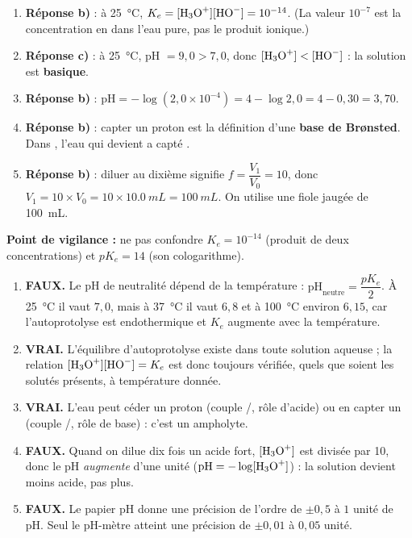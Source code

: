 \documentclass[11pt]{article}
\newcommand{\cle}[1]{{\popxbold\color{popdark}#1}}
\begin{document}
\begin{corrige}
\begin{enumerate}
\item \textbf{Réponse b)} : à \SI{25}{\celsius}, $K_e = [\ce{H3O+}][\ce{HO-}] = 10^{-14}$. (La valeur $10^{-7}$ est la concentration en  dans l'eau pure, pas le produit ionique.)
\item \textbf{Réponse c)} : à \SI{25}{\celsius}, pH $= 9{,}0 > 7{,}0$, donc $[\ce{H3O+}] < [\ce{HO-}]$ : la solution est \textbf{basique}.
\item \textbf{Réponse b)} : $\mathrm{pH} = -\log(2{,}0\times10^{-4}) = 4 - \log 2{,}0 = 4 - 0{,}30 = 3{,}70$.
\item \textbf{Réponse b)} : capter un proton est la définition d'une \textbf{base de Brønsted}. Dans , l'eau qui devient  a capté .
\item \textbf{Réponse b)} : diluer au dixième signifie $f = \dfrac{V_1}{V_0} = 10$, donc $V_1 = 10 \times V_0 = 10 \times \SI{10,0}{mL} = \SI{100}{mL}$. On utilise une fiole jaugée de \SI{100}{mL}.
\end{enumerate}
\textbf{Point de vigilance :} ne pas confondre $K_e = 10^{-14}$ (produit de deux concentrations) et $pK_e = 14$ (son cologarithme).
\end{corrige}

\begin{corrige}
\begin{enumerate}
\item \textbf{FAUX.} Le pH de neutralité dépend de la température : $\mathrm{pH}_{\text{neutre}} = \dfrac{pK_e}{2}$. À \SI{25}{\celsius} il vaut $7{,}0$, mais à \SI{37}{\celsius} il vaut $6{,}8$ et à \SI{100}{\celsius} environ $6{,}15$, car l'autoprotolyse est endothermique et $K_e$ augmente avec la température.
\item \textbf{VRAI.} L'équilibre d'autoprotolyse existe dans toute solution aqueuse ; la relation $[\ce{H3O+}][\ce{HO-}] = K_e$ est donc toujours vérifiée, quels que soient les solutés présents, à température donnée.
\item \textbf{VRAI.} L'eau peut céder un proton (couple /, rôle d'acide) ou en capter un (couple /, rôle de base) : c'est un \cle{ampholyte}.
\item \textbf{FAUX.} Quand on dilue dix fois un acide fort, $[\ce{H3O+}]$ est divisée par 10, donc le pH \emph{augmente} d'une unité ($\mathrm{pH} = -\log[\ce{H3O+}]$) : la solution devient moins acide, pas plus.
\item \textbf{FAUX.} Le papier pH donne une précision de l'ordre de $\pm 0{,}5$ à $1$ unité de pH. Seul le pH-mètre atteint une précision de $\pm 0{,}01$ à $0{,}05$ unité.
\end{enumerate}
\end{corrige}
\end{document}
